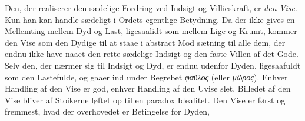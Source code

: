 \documentclass[12pt,a4paper]{book}
\newcommand{\gk}[1]{\textit{#1}}
\begin{document}
Den, der realiserer den sædelige Fordring ved Indsigt og
Villieskraft, er \emph{den Vise}. Kun han kan handle sædeligt i
Ordets egentlige Betydning. Da der ikke gives en Mellemting
mellem Dyd og Last, ligesaalidt som mellem Lige og Krumt,
kommer den Vise som den Dydige til at staae i abstract Mod\-%
sætning til alle dem, der endnu ikke have naaet den rette
sædelige Indsigt og den faste Villen af det Gode. Selv den,
der nærmer sig til Indsigt og Dyd, er endnu udenfor Dyden,
ligesaafuldt som den Lastefulde, og gaaer ind under Begrebet
\gk{φαῦλος} (eller \gk{μῶρος}). Enhver Handling af den Vise er god,
enhver Handling af den Uvise slet. Billedet af den Vise bliver
af Stoikerne løftet op til en paradox Idealitet. Den Vise er først
og fremmest, hvad der overhovedet er Betingelse for Dyden,
\setcounter{footnote}{0}
\end{document}
